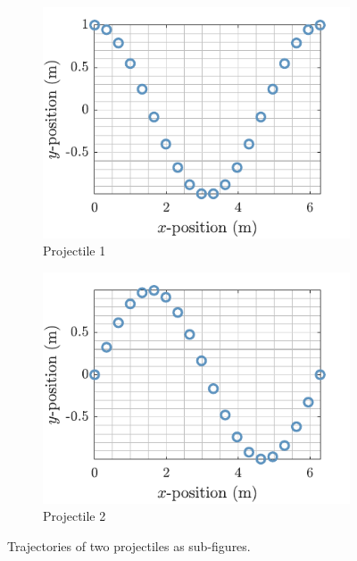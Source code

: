 \begin{figure}
    \centering
    \begin{subfigure}[t]{0.49\columnwidth}
    \centering
        \includegraphics[width=\linewidth]{Images/Cos.pdf}
        \caption{Projectile 1}
        \label{fig:Projectile1}
    \end{subfigure}\hfill
    \begin{subfigure}[t]{0.49\columnwidth}
    \centering
        \includegraphics[width=\linewidth]{Images/Sin.pdf}
        \caption{Projectile 2}
        \label{fig:Projectile2}
    \end{subfigure}
    \caption{Trajectories of two projectiles as sub-figures.}
    \label{fig:ProjectilesSubFig}
\end{figure}

